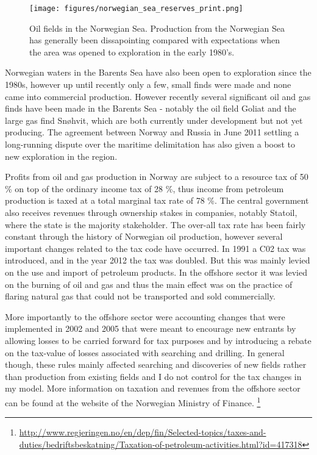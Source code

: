 \documentclass[12pt]{article}
\begin{document}
\begin{figure}
\texttt{[image: figures/norwegian\_sea\_reserves\_print.png]}
\caption{Oil fields in the Norwegian Sea.  Production from the Norwegian Sea has generally been dissapointing compared with expectations when the area was opened to exploration in the early 1980's.}
\label{norwegian_sea_reserves}
\end{figure}

Norwegian waters in the Barents Sea have also been open to exploration since the 1980s, however up until recently only a few, small finds were made and none came into commercial production.  However recently several significant oil and gas finds have been made in the Barents Sea - notably the oil field Goliat and the large gas find Sn\o hvit, which are both currently under development but not yet producing.  The agreement between Norway and Russia in June 2011 settling a long-running dispute over the maritime delimitation has also given a boost to new exploration in the region.  

Profits from oil and gas production in Norway are subject to a resource tax of 50 \% on top of the ordinary income tax of 28 \%, thus income from petroleum production is taxed at a total marginal tax rate of 78 \%.  The central government also receives revenues through ownership stakes in companies, notably Statoil, where the state is the majority stakeholder.  The over-all tax rate has been fairly constant through the history of Norwegian oil production, however several important changes related to the tax code have occurred.  In 1991 a C02 tax was introduced, and in the year 2012 the tax was doubled.  But this was mainly levied on the use and import of petroleum products.  In the offshore sector it was levied on the burning of oil and gas and thus the main effect was on the practice of flaring natural gas that could not be transported and sold commercially.   

More importantly to the offshore sector were accounting changes that were implemented in 2002 and 2005 that were meant to encourage new entrants by allowing losses to be carried forward for tax purposes and by introducing a rebate on the tax-value of losses associated with searching and drilling.  In general though, these rules mainly affected searching and discoveries of new fields rather than production from existing fields and I do not control for the tax changes in my model.  More information on taxation and revenues from the offshore sector can be found at the website of the Norwegian Ministry of Finance. \footnote{\url{http://www.regjeringen.no/en/dep/fin/Selected-topics/taxes-and-duties/bedriftsbeskatning/Taxation-of-petroleum-activities.html?id=417318}}
\end{document}

